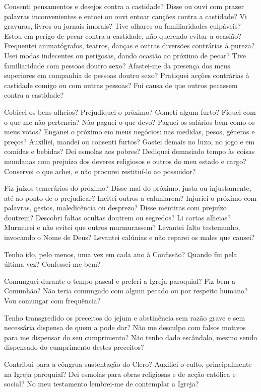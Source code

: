 Consenti pensamentos e desejos contra a castidade? Disse ou ouvi com prazer palavras inconvenientes e entoei ou ouvi entoar canções contra a castidade? Vi gravuras, livros ou jornais imorais? Tive olhares ou familiaridades culpáveis? Estou em perigo de pecar contra a castidade, não querendo evitar a ocasião? Frequentei animatógrafos, teatros, danças e outras diversões contrárias à pureza? Usei modas indecentes ou perigosas, dando ocasião ao próximo de pecar? Tive familiaridade com pessoas doutro sexo? Afastei-me da presença dos meus superiores em companhia de pessoas doutro sexo? Pratiquei acções contrárias à castidade comigo ou com outras pessoas? Fui causa de que outros pecassem contra a castidade?

Cobicei os bens alheios? Prejudiquei o próximo? Cometi algum furto? Fiquei com o que me não pertencia? Não paguei o que devo? Paguei os salários bem como os meus votos? Enganei o próximo em meus negócios: nas medidas, pesos, géneros e preços? Auxiliei, mandei ou consenti furtos? Gastei demais no luxo, no jogo e em comidas e bebidas? Dei esmolas aos pobres? Dediquei demasiado tempo às coisas mundanas com prejuízo dos deveres religiosos e outros do meu estado e cargo? Conservei o que achei, e não procurei restituí-lo ao possuidor?

Fiz juízos temerários do próximo? Disse mal do próximo, justa ou injustamente, até ao ponto de o prejudicar? Incitei outros a caluniarem? Injuriei o próximo com palavras, gestos, maledicência ou desprezo? Disse mentiras com prejuízo doutrem? Descobri faltas ocultas doutrem ou segredos? Li cartas alheias? Murmurei e não evitei que outros murmurassem? Levantei falto testemunho, invocando o Nome de Deus? Levantei calúnias e não reparei os males que causei?

Tenho ido, pelo menos, uma vez em cada ano à Confissão? Quando fui pela última vez? Confessei-me bem?

Comunguei durante o tempo pascal e preferi a Igreja paroquial? Fiz bem a Comunhão? Não teria comungado com algum pecado ou por respeito humano? Vou comungar com frequência?

Tenho transgredido os preceitos do jejum e abstinência sem razão grave e sem necessária dispensa de quem a pode dar? Não me desculpo com falsos motivos para me dispensar do seu cumprimento? Não tenho dado escândalo, mesmo sendo dispensado do cumprimento destes preceitos?

Contribui para a côngrua sustentação do Clero? Auxiliei o culto, principalmente na Igreja paroquial? Dei esmolas para obras religiosas e de acção católica e social? No meu testamento lembrei-me de contemplar a Igreja?

